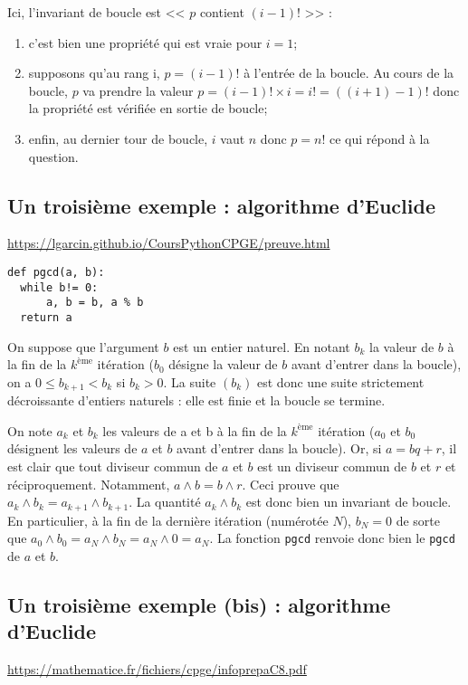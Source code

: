 Ici, l'invariant de boucle est << $p$ contient $(i-1)!$ >> : 
\begin{enumerate}
\item c'est bien une propriété qui est vraie pour $i=1$;
\item supposons qu'au rang i, $p=(i-1)!$ à l'entrée de la boucle. Au cours de la boucle, $p$ va prendre la valeur $p=(i-1)!\times i=i!=((i+1)-1)!$ donc la propriété est vérifiée en sortie de boucle;
\item enfin, au dernier tour de boucle, $i$ vaut $n$ donc $p=n!$ ce qui répond à la question.\\
\end{enumerate}

\subsection{Un troisième exemple : algorithme d'Euclide}
\url{https://lgarcin.github.io/CoursPythonCPGE/preuve.html}

\begin{lstlisting}
def pgcd(a, b):
  while b!= 0:
      a, b = b, a % b
  return a
\end{lstlisting}

On suppose que l'argument $b$ est un entier naturel. En notant $b_k$ la valeur de $b$ à la fin de la $k^\text{ème}$ itération ($b_0$ désigne la valeur de $b$ avant d'entrer dans la boucle), on a $0\leq b_{k+1}<b_k$ si $b_k>0$. La suite $(b_k)$ est donc une suite strictement décroissante d'entiers naturels : elle est finie et la boucle se termine.


On note $a_k$ et $b_k$ les valeurs de a et b à la fin de la $k^\text{ème}$ itération ($a_0$ et $b_0$ désignent les valeurs de $a$ et $b$ avant d'entrer dans la boucle). Or, si $a=bq+r$, il est clair que tout diviseur commun de $a$ et $b$ est un diviseur commun de $b$ et $r$ et réciproquement. Notamment, $a\wedge b=b\wedge r$. Ceci prouve que $a_k\wedge b_k=a_{k+1}\wedge b_{k+1}$. La quantité $a_k\wedge b_k$ est donc bien un invariant de boucle. En particulier, à la fin de la dernière itération (numérotée $N$), $b_N=0$ de sorte que $a_0\wedge b_0=a_N\wedge b_N=a_N\wedge0=a_N$. La fonction \texttt{pgcd} renvoie donc bien le \texttt{pgcd} de $a$ et $b$.

\subsection{Un troisième exemple (bis) : algorithme d'Euclide}
\url{https://mathematice.fr/fichiers/cpge/infoprepaC8.pdf}

